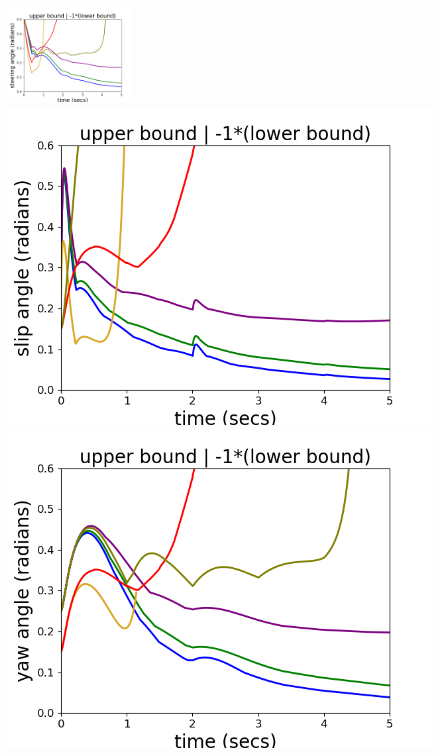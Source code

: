 \begin{figure}
\includegraphics[scale = width=3.5cm,height=2.5cm]{autocarImages/ubToolSteering.png}%
\includegraphics[scale = 0.39]{autocarImages/ubToolSlip.png}
\includegraphics[scale = 0.39]{autocarImages/ubToolYaw.png}%

\end{figure}

